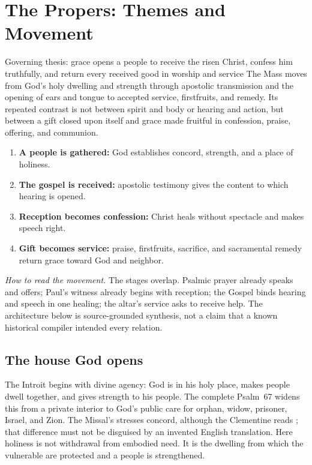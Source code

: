 \section*{The Propers: Themes and Movement}
\label{triptych:brief-synthesis:start}

\begingroup\footnotesize

\begin{massbox}{Governing thesis: grace opens a people to receive the risen Christ, confess him truthfully, and return every received good in worship and service}
The Mass moves from God's holy dwelling and strength through apostolic
transmission and the opening of ears and tongue to accepted service,
firstfruits, and remedy. Its repeated contrast is not between spirit and body
or hearing and action, but between a gift closed upon itself and grace made
fruitful in confession, praise, offering, and communion.
\end{massbox}

\begin{enumerate}[leftmargin=1.5em,itemsep=0.1em]
\item \textbf{A people is gathered:} God establishes concord, strength, and a place of holiness.
\item \textbf{The gospel is received:} apostolic testimony gives the content to which hearing is opened.
\item \textbf{Reception becomes confession:} Christ heals without spectacle and makes speech right.
\item \textbf{Gift becomes service:} praise, firstfruits, sacrifice, and sacramental remedy return grace toward God and neighbor.
\end{enumerate}

\noindent\emph{How to read the movement.} The stages overlap. Psalmic prayer
already speaks and offers; Paul's witness already begins with reception; the
Gospel binds hearing and speech in one healing; the altar's service asks to
receive help. The architecture below is source-grounded synthesis, not a claim
that a known historical compiler intended every relation.

\subsection*{The house God opens}

The Introit begins with divine agency: God is in his holy place, makes people
dwell together, and gives strength to his people. The complete Psalm~67
widens this from a private interior to God's public care for orphan, widow,
prisoner, Israel, and Zion. The Missal's  stresses concord,
although the Clementine reads ; that difference must not
be disguised by an invented English translation. Here holiness is not
withdrawal from embodied need. It is the dwelling from which the vulnerable
are protected and a people is strengthened.

